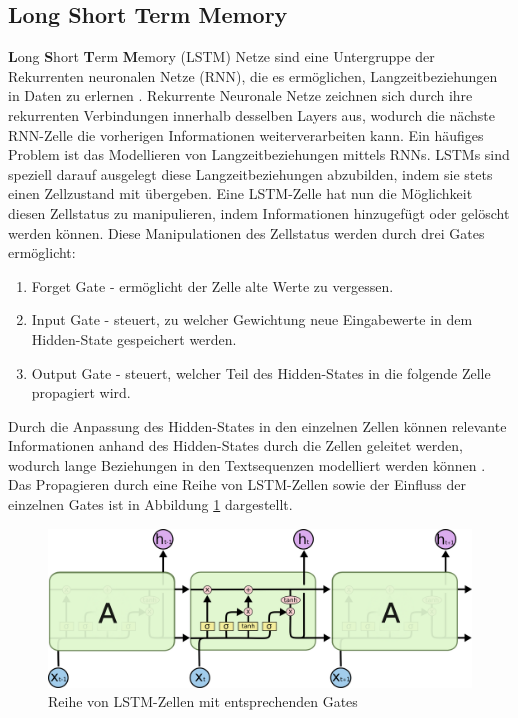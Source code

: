 \subsection{\textbf{L}ong \textbf{S}hort \textbf{T}erm \textbf{M}emory}
\textbf{L}ong \textbf{S}hort \textbf{T}erm \textbf{M}emory (LSTM) Netze sind eine Untergruppe der Rekurrenten neuronalen Netze (RNN), die es ermöglichen, Langzeitbeziehungen in Daten zu erlernen \citep{lstm}.
Rekurrente Neuronale Netze zeichnen sich durch ihre rekurrenten Verbindungen innerhalb desselben Layers aus, wodurch die nächste RNN-Zelle die vorherigen Informationen weiterverarbeiten kann.
Ein häufiges Problem ist das Modellieren von Langzeitbeziehungen mittels RNNs. 
LSTMs sind speziell darauf ausgelegt diese Langzeitbeziehungen abzubilden, indem sie stets einen Zellzustand mit übergeben.
Eine LSTM-Zelle hat nun die Möglichkeit diesen Zellstatus zu manipulieren, indem Informationen hinzugefügt oder gelöscht werden können.
Diese Manipulationen des Zellstatus werden durch drei Gates ermöglicht:
\begin{enumerate}
    \item Forget Gate - ermöglicht der Zelle alte Werte zu vergessen.
    \item Input Gate - steuert, zu welcher Gewichtung neue Eingabewerte in dem Hidden-State gespeichert werden.
    \item Output Gate - steuert, welcher Teil des Hidden-States in die folgende Zelle propagiert wird.
\end{enumerate}

Durch die Anpassung des Hidden-States in den einzelnen Zellen können relevante Informationen anhand des Hidden-States durch die Zellen geleitet werden, wodurch lange Beziehungen in den Textsequenzen modelliert werden können \citep{lstmexplained}.
Das Propagieren durch eine Reihe von LSTM-Zellen sowie der Einfluss der einzelnen Gates ist in Abbildung \ref{lstm_chain} dargestellt.


\begin{figure}[h]
    \label{lstm_chain}
    \centering
    \includegraphics[width=\textwidth]{bilder/LSTM3-chain}
    \caption{Reihe von LSTM-Zellen mit entsprechenden Gates \citep{lstmexplained}}
\end{figure}

\pagebreak
